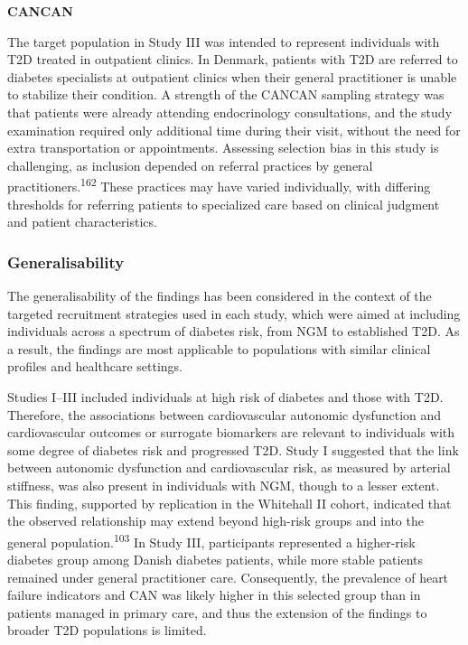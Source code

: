 \documentclass[
  letterpaper,
  headsepline=true,
  open=any]{scrbook}
\begin{document}
\textbf{CANCAN}

The target population in Study III was intended to represent individuals
with T2D treated in outpatient clinics. In Denmark, patients with T2D
are referred to diabetes specialists at outpatient clinics when their
general practitioner is unable to stabilize their condition. A strength
of the CANCAN sampling strategy was that patients were already attending
endocrinology consultations, and the study examination required only
additional time during their visit, without the need for extra
transportation or appointments. Assessing selection bias in this study
is challenging, as inclusion depended on referral practices by general
practitioners.\textsuperscript{162} These practices may have varied
individually, with differing thresholds for referring patients to
specialized care based on clinical judgment and patient characteristics.

\hypertarget{generalisability}{%
\subsubsection{Generalisability}\label{generalisability}}

The generalisability of the findings has been considered in the context
of the targeted recruitment strategies used in each study, which were
aimed at including individuals across a spectrum of diabetes risk, from
NGM to established T2D. As a result, the findings are most applicable to
populations with similar clinical profiles and healthcare settings.

Studies I--III included individuals at high risk of diabetes and those
with T2D. Therefore, the associations between cardiovascular autonomic
dysfunction and cardiovascular outcomes or surrogate biomarkers are
relevant to individuals with some degree of diabetes risk and progressed
T2D. Study I suggested that the link between autonomic dysfunction and
cardiovascular risk, as measured by arterial stiffness, was also present
in individuals with NGM, though to a lesser extent. This finding,
supported by replication in the Whitehall II cohort, indicated that the
observed relationship may extend beyond high-risk groups and into the
general population.\textsuperscript{103} In Study III, participants
represented a higher-risk diabetes group among Danish diabetes patients,
while more stable patients remained under general practitioner care.
Consequently, the prevalence of heart failure indicators and CAN was
likely higher in this selected group than in patients managed in primary
care, and thus the extension of the findings to broader T2D populations
is limited.
\end{document}

